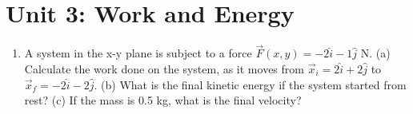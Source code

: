 \documentclass[10pt]{article}
\begin{document}
\section{Unit 3: Work and Energy}

\begin{enumerate}
\item A system in the x-y plane is subject to a force $\vec{F}(x,y) = -2\hat{i} - 1\hat{j}$ N.  (a) Calculate the work done on the system, as it moves from $\vec{x}_i = 2\hat{i} + 2\hat{j}$ to $\vec{x}_f = -2\hat{i} - 2\hat{j}$. (b) What is the final kinetic energy if the system started from rest?  (c) If the mass is 0.5 kg, what is the final velocity? \\ \vspace{2.5cm}
\end{enumerate}
\end{document}
